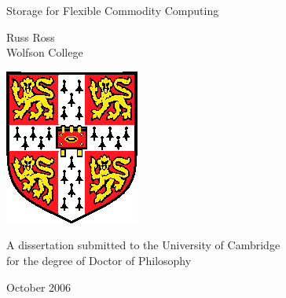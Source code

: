 \pagestyle{empty}

\begin{center}
\vspace*{\fill}

%

\vspace*{\fill}

\Huge
Storage for Flexible Commodity Computing

\vfill
\vfill

\Huge
Russ Ross\\[6mm]
\Large
Wolfson College

\vfill
\includegraphics{eps/camshield}
\vfill

\Large
A dissertation submitted to the University of Cambridge\\
for the degree of Doctor of Philosophy

\vfill

October 2006

\vspace*{\fill}
\end{center}
\cleardoublepage

\pagestyle{plain}

%

\enlargethispage*{60cm}        %

{}
\cleardoublepage

%

%        
%

%

